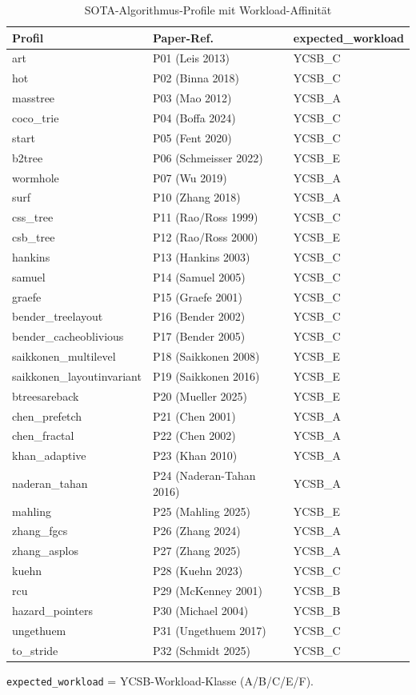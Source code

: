 \begin{table}[!htbp]
  \caption{SOTA-Algorithmus-Profile mit Workload-Affinität}\label{tab:sota-profiles}
  \centering\small
  \begin{tabular}{lll}
    \toprule
    \textbf{Profil} & \textbf{Paper-Ref.} & \textbf{expected\_workload} \\
    \midrule
    art & P01 (Leis 2013) & YCSB\_C \\
    hot & P02 (Binna 2018) & YCSB\_C \\
    masstree & P03 (Mao 2012) & YCSB\_A \\
    coco\_trie & P04 (Boffa 2024) & YCSB\_C \\
    start & P05 (Fent 2020) & YCSB\_C \\
    b2tree & P06 (Schmeisser 2022) & YCSB\_E \\
    wormhole & P07 (Wu 2019) & YCSB\_A \\
    surf & P10 (Zhang 2018) & YCSB\_A \\
    css\_tree & P11 (Rao/Ross 1999) & YCSB\_C \\
    csb\_tree & P12 (Rao/Ross 2000) & YCSB\_E \\
    hankins & P13 (Hankins 2003) & YCSB\_C \\
    samuel & P14 (Samuel 2005) & YCSB\_C \\
    graefe & P15 (Graefe 2001) & YCSB\_C \\
    bender\_treelayout & P16 (Bender 2002) & YCSB\_C \\
    bender\_cacheoblivious & P17 (Bender 2005) & YCSB\_C \\
    saikkonen\_multilevel & P18 (Saikkonen 2008) & YCSB\_E \\
    saikkonen\_layoutinvariant & P19 (Saikkonen 2016) & YCSB\_E \\
    btreesareback & P20 (Mueller 2025) & YCSB\_E \\
    chen\_prefetch & P21 (Chen 2001) & YCSB\_A \\
    chen\_fractal & P22 (Chen 2002) & YCSB\_A \\
    khan\_adaptive & P23 (Khan 2010) & YCSB\_A \\
    naderan\_tahan & P24 (Naderan-Tahan 2016) & YCSB\_A \\
    mahling & P25 (Mahling 2025) & YCSB\_E \\
    zhang\_fgcs & P26 (Zhang 2024) & YCSB\_A \\
    zhang\_asplos & P27 (Zhang 2025) & YCSB\_A \\
    kuehn & P28 (Kuehn 2023) & YCSB\_C \\
    rcu & P29 (McKenney 2001) & YCSB\_B \\
    hazard\_pointers & P30 (Michael 2004) & YCSB\_B \\
    ungethuem & P31 (Ungethuem 2017) & YCSB\_C \\
    to\_stride & P32 (Schmidt 2025) & YCSB\_C \\
    \bottomrule
  \end{tabular}

  \smallskip
  {\footnotesize \texttt{expected\_workload} = YCSB-Workload-Klasse (A/B/C/E/F).\par}
\end{table}

